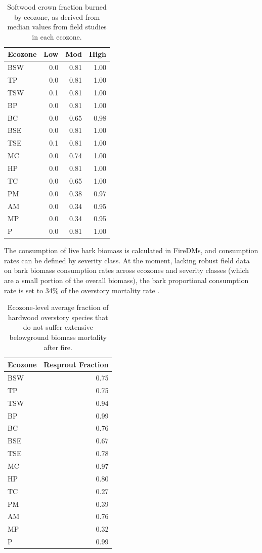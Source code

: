 \documentclass[, manuscript]{copernicus}
\begin{document}
\begin{table}
\centering
\caption{\label{tab:tab-CFBByEcozone}Softwood crown fraction burned by ecozone, as derived from median values from field studies in each ecozone.}
\centering
\begin{tabular}[t]{l|r|r|r}
\hline
Ecozone & Low & Mod & High\\
\hline
BSW & 0.0 & 0.81 & 1.00\\
\hline
TP & 0.0 & 0.81 & 1.00\\
\hline
TSW & 0.1 & 0.81 & 1.00\\
\hline
BP & 0.0 & 0.81 & 1.00\\
\hline
BC & 0.0 & 0.65 & 0.98\\
\hline
BSE & 0.0 & 0.81 & 1.00\\
\hline
TSE & 0.1 & 0.81 & 1.00\\
\hline
MC & 0.0 & 0.74 & 1.00\\
\hline
HP & 0.0 & 0.81 & 1.00\\
\hline
TC & 0.0 & 0.65 & 1.00\\
\hline
PM & 0.0 & 0.38 & 0.97\\
\hline
AM & 0.0 & 0.34 & 0.95\\
\hline
MP & 0.0 & 0.34 & 0.95\\
\hline
P & 0.0 & 0.81 & 1.00\\
\hline
\end{tabular}
\end{table}

The consumption of live bark biomass is calculated in FireDMs, and
consumption rates can be defined by severity class. At the moment,
lacking robust field data on bark biomass consumption rates across
ecozones and severity classes (which are a small portion of the overall
biomass), the bark proportional consumption rate is set to 34\% of the
overstory mortality rate \citep{santín2015}.

\begin{table}
\centering
\caption{\label{tab:tab-ReSproutByEcozone}Ecozone-level average fraction of hardwood overstory species that do not suffer extensive belowground biomass mortality after fire.}
\centering
\begin{tabular}[t]{l|r}
\hline
Ecozone & Resprout Fraction\\
\hline
BSW & 0.75\\
\hline
TP & 0.75\\
\hline
TSW & 0.94\\
\hline
BP & 0.99\\
\hline
BC & 0.76\\
\hline
BSE & 0.67\\
\hline
TSE & 0.78\\
\hline
MC & 0.97\\
\hline
HP & 0.80\\
\hline
TC & 0.27\\
\hline
PM & 0.39\\
\hline
AM & 0.76\\
\hline
MP & 0.32\\
\hline
P & 0.99\\
\hline
\end{tabular}
\end{table}
\end{document}
